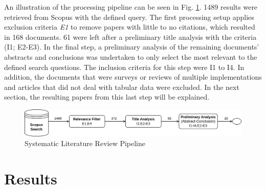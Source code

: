An illustration of the processing pipeline can be seen in Fig. \ref{fig:slr_pipeline}. 1489 results were retrieved from Scopus with the defined query. The first processing setup applies exclusion criteria \textit{E1} to remove papers with little to no citations, which resulted in 168 documents. 61 were left after a preliminary title analysis with the criteria (I1; E2-E3). In the final step, a preliminary analysis of the remaining documents' abstracts and conclusions was undertaken to only select the most relevant to the defined search questions. The inclusion criteria for this step were I1 to I4. In addition, the documents that were surveys or reviews of multiple implementations and articles that did not deal with tabular data were excluded. In the next section, the resulting papers from this last step will be explained.

\begin{figure}[htp]
\centering
\includegraphics[width=\textwidth]{figures/slr_pipeline.png}
\caption{Systematic Literature Review Pipeline}
\label{fig:slr_pipeline}
\end{figure}




\section{Results}\label{sec:stoa_results}

